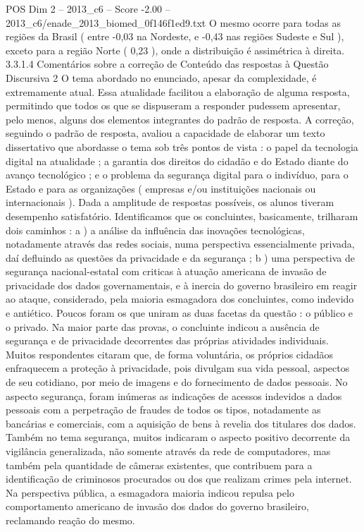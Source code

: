 \begin{textsample}{POS Dim 2 – 2013\_c6 – Score -2.00 – 2013\_c6/enade\_2013\_biomed\_0f146f1ed9.txt}
O mesmo ocorre para todas as regiões da Brasil ( entre -0,03 na Nordeste, e -0,43 nas regiões Sudeste e Sul ), exceto para a região Norte ( 0,23 ), onde a distribuição é assimétrica à direita. 3.3.1.4 Comentários sobre a correção de Conteúdo das respostas à Questão Discursiva 2 O tema abordado no enunciado, apesar da complexidade, é extremamente atual.
Essa atualidade facilitou a elaboração de alguma resposta, permitindo que todos os que se dispuseram a responder pudessem apresentar, pelo menos, alguns dos elementos integrantes do padrão de resposta.
A correção, seguindo o padrão de resposta, avaliou a capacidade de elaborar um texto dissertativo que abordasse o tema sob três pontos de vista : o papel da tecnologia digital na atualidade ; a garantia dos direitos do cidadão e do Estado diante do avanço tecnológico ; e o problema da segurança digital para o indivíduo, para o Estado e para as organizações ( empresas e/ou instituições nacionais ou internacionais ).
Dada a amplitude de respostas possíveis, os alunos tiveram desempenho satisfatório.
Identificamos que os concluintes, basicamente, trilharam dois caminhos : a ) a análise da influência das inovações tecnológicas, notadamente através das redes sociais, numa perspectiva essencialmente privada, daí defluindo as questões da privacidade e da segurança ; b ) uma perspectiva de segurança nacional-estatal com criticas à atuação americana de invasão de privacidade dos dados governamentais, e à inercia do governo brasileiro em reagir ao ataque, considerado, pela maioria esmagadora dos concluintes, como indevido e antiético.
Poucos foram os que uniram as duas facetas da questão : o público e o privado.
Na maior parte das provas, o concluinte indicou a ausência de segurança e de privacidade decorrentes das próprias atividades individuais.
Muitos respondentes citaram que, de forma voluntária, os próprios cidadãos enfraquecem a proteção à privacidade, pois divulgam sua vida pessoal, aspectos de seu cotidiano, por meio de imagens e do fornecimento de dados pessoais.
No aspecto segurança, foram inúmeras as indicações de acessos indevidos a dados pessoais com a perpetração de fraudes de todos os tipos, notadamente as bancárias e comerciais, com a aquisição de bens à revelia dos titulares dos dados.
Também no tema segurança, muitos indicaram o aspecto positivo decorrente da vigilância generalizada, não somente através da rede de computadores, mas também pela quantidade de câmeras existentes, que contribuem para a identificação de criminosos procurados ou dos que realizam crimes pela internet.
Na perspectiva pública, a esmagadora maioria indicou repulsa pelo comportamento americano de invasão dos dados do governo brasileiro, reclamando reação do mesmo.

\end{textsample}
